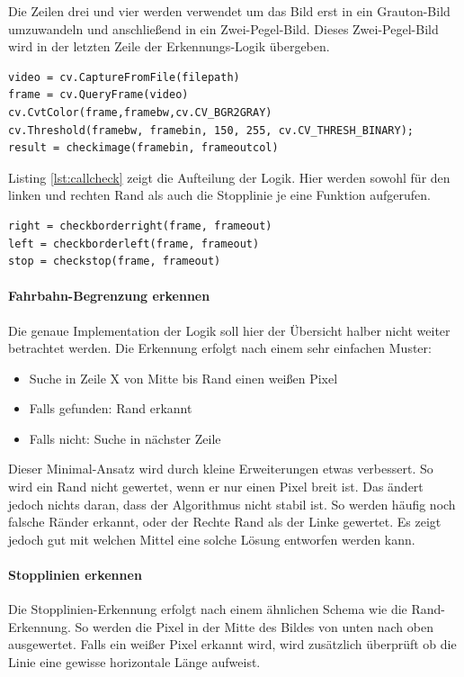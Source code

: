 \documentclass[a4paper,DIV=calc,ngerman]{scrartcl}
\begin{document}
Die Zeilen drei und vier werden verwendet um das Bild erst in ein Grauton-Bild umzuwandeln und anschließend in ein Zwei-Pegel-Bild. Dieses Zwei-Pegel-Bild wird in der letzten Zeile der Erkennungs-Logik übergeben.

\begin{lstlisting}[frame=single, float, caption={Einlesen eines Bilds}, label={lst:getframe}]
video = cv.CaptureFromFile(filepath)
frame = cv.QueryFrame(video)
cv.CvtColor(frame,framebw,cv.CV_BGR2GRAY)
cv.Threshold(framebw, framebin, 150, 255, cv.CV_THRESH_BINARY);
result = checkimage(framebin, frameoutcol)
\end{lstlisting}

Listing \ref{lst:callcheck} zeigt die Aufteilung der Logik. Hier werden sowohl für den linken und rechten Rand als auch die Stopplinie je eine Funktion aufgerufen.

\begin{lstlisting}[frame=single, float, caption={Aufruf der Fahrbahn-Erkennung}, label={lst:callcheck}]
right = checkborderright(frame, frameout)
left = checkborderleft(frame, frameout)
stop = checkstop(frame, frameout)
\end{lstlisting}

\paragraph{Fahrbahn-Begrenzung erkennen}
Die genaue Implementation der Logik soll hier der Übersicht halber nicht weiter betrachtet werden. Die Erkennung erfolgt nach einem sehr einfachen Muster:

\begin{itemize}
    \item Suche in Zeile X von Mitte bis Rand einen weißen Pixel
    \item Falls gefunden: Rand erkannt
    \item Falls nicht: Suche in nächster Zeile
\end{itemize}

Dieser Minimal-Ansatz wird durch kleine Erweiterungen etwas verbessert. So wird ein Rand nicht gewertet, wenn er nur einen Pixel breit ist. Das ändert jedoch nichts daran, dass der Algorithmus nicht stabil ist. So werden häufig noch falsche Ränder erkannt, oder der Rechte Rand als der Linke gewertet. Es zeigt jedoch gut mit welchen Mittel eine solche Lösung entworfen werden kann.

\paragraph{Stopplinien erkennen}
Die Stopplinien-Erkennung erfolgt nach einem ähnlichen Schema wie die Rand-Erkennung. So werden die Pixel in der Mitte des Bildes von unten nach oben ausgewertet. Falls ein weißer Pixel erkannt wird, wird zusätzlich überprüft ob die Linie eine gewisse horizontale Länge aufweist.
\end{document}
